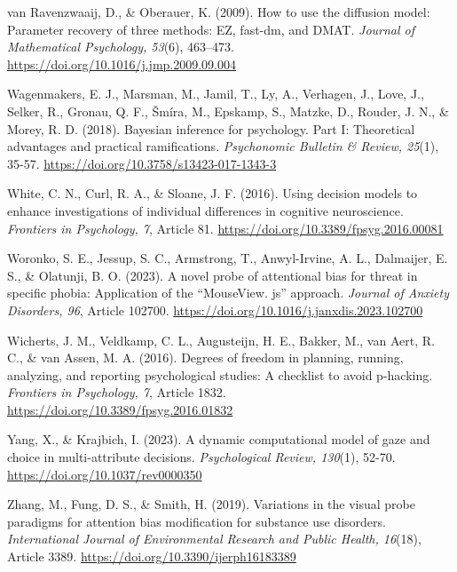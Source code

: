 \documentclass[authordate, empirical]{jote-new-article}
\begin{document}
	van Ravenzwaaij, D., \& Oberauer, K. (2009). How to use the diffusion model: Parameter recovery of three methods: EZ, fast-dm, and DMAT. \emph{Journal of Mathematical Psychology, 53}(6), 463--473. \url{https://doi.org/10.1016/j.jmp.2009.09.004}



	Wagenmakers, E. J., Marsman, M., Jamil, T., Ly, A., Verhagen, J., Love, J., Selker, R., Gronau, Q. F., Šmíra, M., Epskamp, S., Matzke, D., Rouder, J. N., \& Morey, R. D. (2018). Bayesian inference for psychology. Part I: Theoretical advantages and practical ramifications. \emph{Psychonomic Bulletin \& Review, 25}(1), 35-57. \url{https://doi.org/10.3758/s13423-017-1343-3}



	White, C. N., Curl, R. A., \& Sloane, J. F. (2016). Using decision models to enhance investigations of individual differences in cognitive neuroscience. \emph{Frontiers in Psychology, 7}, Article 81. \url{https://doi.org/10.3389/fpsyg.2016.00081}



	Woronko, S. E., Jessup, S. C., Armstrong, T., Anwyl-Irvine, A. L., Dalmaijer, E. S., \& Olatunji, B. O. (2023). A novel probe of attentional bias for threat in specific phobia: Application of the “MouseView. js” approach. \emph{Journal of Anxiety Disorders, 96}, Article 102700. \url{https://doi.org/10.1016/j.janxdis.2023.102700}



	Wicherts, J. M., Veldkamp, C. L., Augusteijn, H. E., Bakker, M., van Aert, R. C., \& van Assen, M. A. (2016). Degrees of freedom in planning, running, analyzing, and reporting psychological studies: A checklist to avoid p-hacking. \emph{Frontiers in Psychology, 7}, Article 1832. \url{https://doi.org/10.3389/fpsyg.2016.01832}



	Yang, X., \& Krajbich, I. (2023). A dynamic computational model of gaze and choice in multi-attribute decisions. \emph{Psychological Review, 130}(1), 52-70. \url{https://doi.org/10.1037/rev0000350}



	Zhang, M., Fung, D. S., \& Smith, H. (2019). Variations in the visual probe paradigms for attention bias modification for substance use disorders. \emph{International Journal of Environmental Research and Public Health, 16}(18), Article 3389. \url{https://doi.org/10.3390/ijerph16183389}
\end{document}
